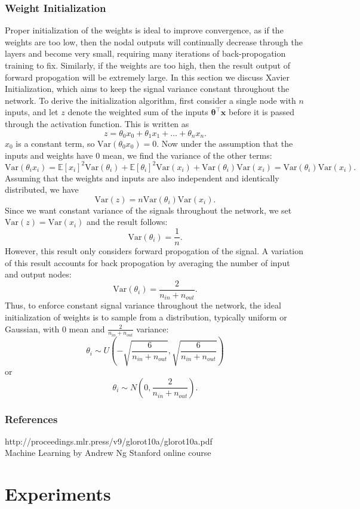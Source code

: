\documentclass[a4paper,12pt]{article}
\newcommand{\E}{\mathbb{E}}
\newcommand{\Var}{\mathrm{Var}}
\numberwithin{equation}{section}
\begin{document}
\subsubsection{Weight Initialization}
Proper initialization of the weights is ideal to improve convergence, as if the weights are too low, then the nodal outputs will continually decrease through the layers and become very small, requiring many iterations of back-propogation training to fix. Similarly, if the weights are too high, then the result output of forward propogation will be extremely large. In this section we discuss Xavier Initialization, which aims to keep the signal variance constant throughout the network. To derive the initialization algorithm, first consider a single node with $n$ inputs, and let $z$ denote the weighted sum of the inputs $\bm{\theta}^\top\textbf{x}$ before it is passed through the activation function. This is written as
\[z=\theta_0x_0+\theta_1x_1+\dots+\theta_nx_n.\]
$x_0$ is a constant term, so $\Var(\theta_0x_0)=0$. Now under the assumption that the inputs and weights have 0 mean, we find the variance of the other terms:
\[\Var(\theta_ix_i)=\E[x_i]^2\Var(\theta_i)+\E[\theta_i]^2\Var(x_i)+\Var(\theta_i)\Var(x_i)=\Var(\theta_i)\Var(x_i).\]
Assuming that the weights and inputs are also independent and identically distributed, we have
\[\Var(z)=n\Var(\theta_i)\Var(x_i).\]
Since we want constant variance of the signals throughout the network, we set $\Var(z)=\Var(x_i)$ and the result follows:
\[\Var(\theta_i)=\frac1n.\]
However, this result only considers forward propogation of the signal. A variation of this result accounts for back propogation by averaging the number of input and output nodes:
\[\Var(\theta_i)=\frac{2}{n_{in}+n_{out}}.\]
Thus, to enforce constant signal variance throughout the network, the ideal initialization of weights is to sample from a distribution, typically uniform or Gaussian, with $0$ mean and $\frac{2}{n_{in}+n_{out}}$ variance:
\[\theta_i\sim U\left(-\sqrt{\frac{6}{n_{in}+n_{out}}},\sqrt{\frac{6}{n_{in}+n_{out}}}\right)\]
or
\[\theta_i\sim N\left(0,\frac{2}{n_{in}+n_{out}}\right).\]
\subsubsection{References}
http://proceedings.mlr.press/v9/glorot10a/glorot10a.pdf\\
Machine Learning by Andrew Ng Stanford online course\\
\newpage
\section{Experiments}
\end{document}
